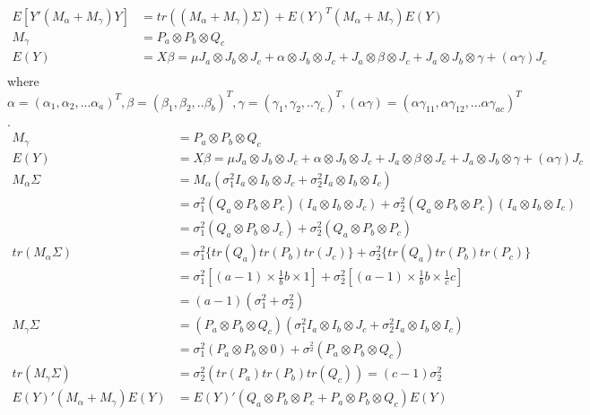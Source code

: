 \documentclass{homework}
\begin{document}
\begin{itemize}
\begin{align*}
E[Y'(M_{\alpha} + M_{\gamma})Y] &= tr \left((M_{\alpha} + M_{\gamma})\Sigma \right) + E(Y)^T(M_{\alpha} + M_{\gamma}) E(Y)\\
M_{\gamma} &= P_a \otimes P_b \otimes Q_c\\
E(Y) &= X\beta = \mu J_a \otimes J_b \otimes J_c + \alpha \otimes J_b \otimes J_c + J_a \otimes \beta \otimes J_c + J_a \otimes J_b \otimes \gamma + (\alpha\gamma) J_c\\
\end{align*} 
where $\alpha = (\alpha_1, \alpha_2,... \alpha_a)^T, \beta = (\beta_1, \beta_2,.. \beta_b)^T, \gamma = (\gamma_1, \gamma_2, .. \gamma_c)^T, (\alpha\gamma) = (\alpha\gamma_{11}, \alpha\gamma_{12}, ... \alpha\gamma_{ac})^T$.\\
\begin{align*}
M_{\gamma} &= P_a \otimes P_b \otimes Q_c\\
E(Y) &= X\beta = \mu J_a \otimes J_b \otimes J_c + \alpha \otimes J_b \otimes J_c + J_a \otimes \beta \otimes J_c + J_a \otimes J_b \otimes \gamma + (\alpha\gamma) J_c\\
M_{\alpha}\Sigma &= M_{\alpha} (\sigma_1^2 I_a \otimes I_b \otimes J_c + \sigma_2^2 I_a \otimes I_b \otimes I_c) \\
&= \sigma_1^2 (Q_a \otimes P_b \otimes P_c) (I_a \otimes I_b \otimes J_c) + \sigma_2^2 (Q_a \otimes P_b \otimes P_c) (I_a \otimes I_b \otimes I_c)\\
&= \sigma_1^2 (Q_a \otimes P_b \otimes J_c) + \sigma_2^2 (Q_a \otimes P_b \otimes P_c)\\
tr(M_{\alpha}\Sigma) &= \sigma_1^2 \{ tr(Q_a) tr(P_b) tr(J_c) \} + \sigma_2^2 \{ tr(Q_a) tr(P_b) tr(P_c)\}\\
&= \sigma_1^2 [(a-1) \times \frac{1}{b} b \times 1] + \sigma_2^2 [(a-1) \times \frac{1}{b} b \times \frac{1}{c} c]\\
&= (a-1)(\sigma_1^2 + \sigma_2^2)\\
M_{\gamma}\Sigma &= (P_a \otimes P_b \otimes Q_c) (\sigma_1^2 I_a \otimes I_b \otimes J_c + \sigma_2^2 I_a \otimes I_b \otimes I_c)\\
&= \sigma_1^2(P_a \otimes P_b \otimes 0) + \sigma^_2^2 (P_a \otimes P_b \otimes Q_c)\\
tr(M_{\gamma} \Sigma) &= \sigma_2^2 (tr(P_a) tr(P_b) tr(Q_c)) = (c-1) \sigma_2^2\\
E(Y)'(M_{\alpha}+ M_{\gamma})E(Y) &= E(Y)'(Q_a \otimes P_b \otimes P_c + P_a \otimes P_b \otimes Q_c) E(Y) \\

\end{align*}
\end{itemize}
\end{document}
